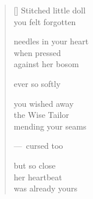 \documentclass[12pt,a4paper]{article}
\begin{document}
\newpage

\poemtitle{}

\settowidth{\versewidth}{she was already yours}

\bigskip

\begin{verse}[\versewidth]
  Stitched little doll \\
  you felt forgotten

  needles in your heart \\
  when pressed \\
  against her bosom

  ever so softly

  you wished away \\
  the Wise Tailor \\
  mending your seams

  ---~cursed too

  but so close \\
  her heartbeat \\
  was already yours
\end{verse}
\end{document}
